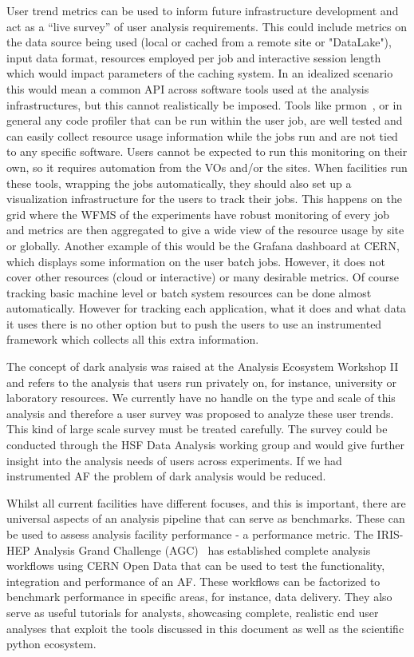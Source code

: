User trend metrics can be used to inform future infrastructure development and act as a “live survey” of user analysis requirements. This could include metrics on the data source being used (local or cached from a remote site or "DataLake"), input data format, resources employed per job and interactive session length which would impact parameters of the caching system. In an idealized scenario this would mean a common API across software tools used at the analysis infrastructures, but this cannot realistically be imposed.  Tools like prmon~\cite{prmon}, or in general any code profiler that can be run within the user job, are well tested and can easily collect resource usage information while the jobs run and are not tied to any specific software. Users cannot be expected to run this monitoring on their own, so it requires automation from the VOs and/or the sites. When facilities run these tools, wrapping the jobs automatically, they should also set up a visualization infrastructure for the users to track their jobs. This happens on the grid where the WFMS of the experiments have robust monitoring of every job and metrics are then aggregated to give a wide view of the resource usage by site or globally. Another example of this would be the Grafana dashboard at CERN, which displays some information on the user batch jobs. However, it does not cover other resources (cloud or interactive) or many desirable metrics. Of course tracking basic machine level or batch system resources can be done almost automatically. However for tracking each application, what it does and what data it uses there is no other option but to push the users to use an instrumented framework which collects all this extra information.

The concept of dark analysis was raised at the Analysis Ecosystem Workshop II and refers to the analysis that users run privately on, for instance, university or laboratory resources. We currently have no handle on the type and scale of this analysis and therefore a user survey was proposed to analyze these user trends. This kind of large scale survey must be treated carefully. The survey could be conducted through the HSF Data Analysis working group and would give further insight into the analysis needs of users across experiments. If we had instrumented AF the problem of dark analysis would be reduced.

Whilst all current facilities have different focuses, and this is important, there are universal aspects of an analysis pipeline that can serve as benchmarks. These can be used to assess analysis facility performance - a performance metric.  The IRIS-HEP Analysis Grand Challenge (AGC)~\cite{agc} has established complete analysis workflows using CERN Open Data that can be used to test the functionality, integration and performance of an AF. These workflows can be factorized to benchmark performance in specific areas, for instance, data delivery. They also serve as useful tutorials for analysts, showcasing complete, realistic end user analyses that exploit the tools discussed in this document as well as the scientific python ecosystem. 

